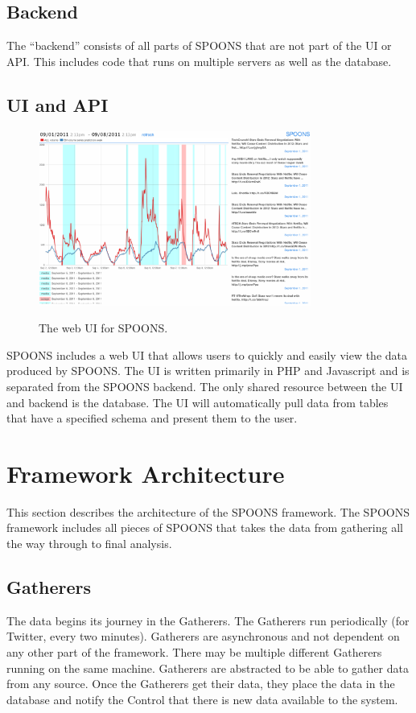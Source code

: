 \documentclass[12pt]{ucthesis}
\newcommand{\captionfonts}{\small\bf\ssp}
\begin{document}
\subsection{Backend}
\label{arch-backend}
The ``backend'' consists of all parts of SPOONS that are not part of the UI or API.
This includes code that runs on multiple servers as well as the database.

\subsection{UI and API}
\label{arch-ui}
\begin{figure}
   \begin{center}
      \includegraphics[width=0.8\textwidth]{images/ui.eps}
      \captionfonts
      \caption[SPOONS UI]{The web UI for SPOONS.}
      \label{fig:ui}
   \end{center}
\end{figure}

SPOONS includes a web UI that allows users to quickly and easily view the data produced by SPOONS.
The UI is written primarily in PHP and Javascript and is separated from the SPOONS backend.
The only shared resource between the UI and backend is the database. The UI will automatically pull
data from tables that have a specified schema and present them to the user.

\section{Framework Architecture}
\label{arch-framework-arch}
This section describes the architecture of the SPOONS framework. The SPOONS framework includes all pieces of SPOONS
that takes the data from gathering all the way through to final analysis.

\subsection{Gatherers}
\label{arch-gatherers}
The data begins its journey in the Gatherers. The Gatherers run periodically (for Twitter, every two minutes).
Gatherers are asynchronous and not dependent on any other part of the framework. There may be multiple different
Gatherers running on the same machine. Gatherers are abstracted to be able to gather data from any source.
Once the Gatherers get their data, they place the data in the database and notify the Control that there is new data
available to the system.
\end{document}
